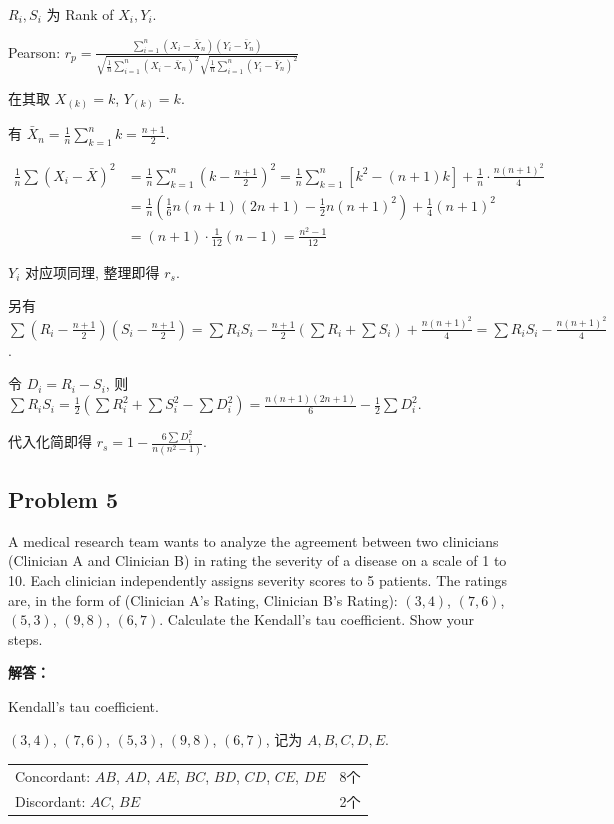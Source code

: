 $R_i, S_i$ 为 Rank of $X_i, Y_i$.

Pearson: $r_p = \frac{\sum_{i=1}^{n} (X_i - \bar{X}_n)(Y_i - \bar{Y}_n)}{\sqrt{\frac{1}{n}\sum_{i=1}^{n}(X_i - \bar{X}_n)^2} \sqrt{\frac{1}{n}\sum_{i=1}^{n}(Y_i - \bar{Y}_n)^2}}$

在其取 $X_{(k)} = k$, $Y_{(k)} = k$.

有 $\bar{X}_n = \frac{1}{n} \sum_{k=1}^{n} k = \frac{n+1}{2}$.

\begin{align*}
\frac{1}{n} \sum(X_i - \bar{X})^2 &= \frac{1}{n} \sum_{k=1}^{n} \left(k - \frac{n+1}{2}\right)^2 = \frac{1}{n} \sum_{k=1}^{n} \left[k^2 - (n+1)k\right] + \frac{1}{n} \cdot \frac{n(n+1)^2}{4} \\
&= \frac{1}{n} \left(\frac{1}{6}n(n+1)(2n+1) - \frac{1}{2}n(n+1)^2\right) + \frac{1}{4}(n+1)^2 \\
&= (n+1) \cdot \frac{1}{12}(n-1) = \frac{n^2 - 1}{12}
\end{align*}

$Y_i$ 对应项同理, 整理即得 $r_s$.

另有 $\sum(R_i - \frac{n+1}{2})(S_i - \frac{n+1}{2}) = \sum R_i S_i - \frac{n+1}{2}(\sum R_i + \sum S_i) + \frac{n(n+1)^2}{4} = \sum R_i S_i - \frac{n(n+1)^2}{4}$.

令 $D_i = R_i - S_i$, 则 $\sum R_i S_i = \frac{1}{2}\left(\sum R_i^2 + \sum S_i^2 - \sum D_i^2\right) = \frac{n(n+1)(2n+1)}{6} - \frac{1}{2}\sum D_i^2$.

代入化简即得 $r_s = 1 - \frac{6\sum D_i^2}{n(n^2 - 1)}$.

\subsection{Problem 5}

A medical research team wants to analyze the agreement between two clinicians (Clinician A and Clinician B) in rating the severity of a disease on a scale of 1 to 10. Each clinician independently assigns severity scores to 5 patients. The ratings are, in the form of (Clinician A's Rating, Clinician B's Rating): $(3, 4)$, $(7, 6)$, $(5, 3)$, $(9, 8)$, $(6, 7)$. Calculate the Kendall's tau coefficient. Show your steps.

\textbf{解答：}

Kendall's tau coefficient.

$(3,4)$, $(7,6)$, $(5,3)$, $(9,8)$, $(6,7)$, 记为 $A, B, C, D, E$.

\begin{center}
\begin{tabular}{ll}
Concordant: $AB$, $AD$, $AE$, $BC$, $BD$, $CD$, $CE$, $DE$ & 8个 \\
Discordant: $AC$, $BE$ & 2个 \\
\end{tabular}
\end{center}

